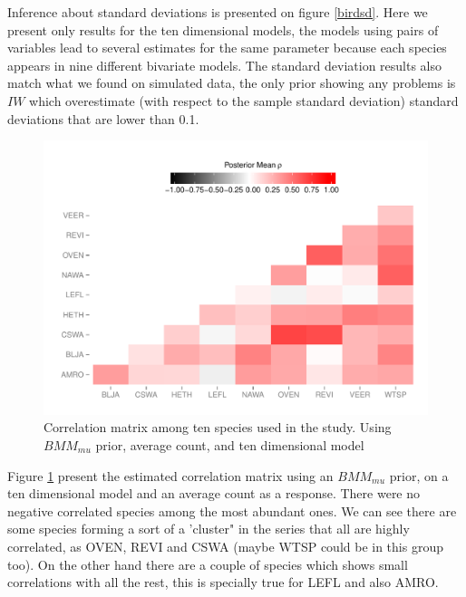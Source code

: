 \documentclass{article}
\begin{document}
Inference about standard deviations is presented on figure \ref{birdsd}. Here we present only results for the ten dimensional models, the models using pairs of variables lead to several estimates for the same parameter because each species appears in nine different bivariate models. The standard deviation results also match what we found on simulated data, the only prior showing any problems is $IW$ which overestimate (with respect to the sample standard deviation) standard deviations that are lower than 0.1. 

\begin{figure}[hbpt]
\centering
\includegraphics[width=\textwidth]{corrmat}
 \vspace{-.5in}
\caption{Correlation matrix among ten species used in the study. Using $BMM_{mu}$ prior, average count, and ten dimensional model \label{fig:mat}}
\end{figure}

Figure \ref{fig:mat} present the estimated correlation matrix using an $BMM_{mu}$ prior, on a ten dimensional model and an average count as a response. There were no negative correlated species among the most abundant ones. We can see there are some species forming a sort of a 'cluster" in the series that all are highly correlated, as  OVEN, REVI and CSWA (maybe WTSP could be in this group too).  On the other hand there are a couple of species which shows small correlations with all the rest, this is specially true for LEFL and also AMRO.  

\end{document}
